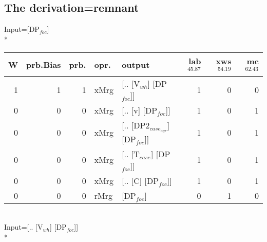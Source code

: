 \subsection{The derivation=remnant}
\begingroup\scriptsize Input=[DP$_{foc}$]\\*
\begin{tabularx}{\linewidth}{rrrlXrrr}
\hline
   W &   prb.Bias &   prb. & opr.   & output                       &   lab$^{45.87}$ &   xws$^{54.19}$ &   mc$^{62.43}$ \\
\hline
   1 &       1 &   1 & xMrg & [.. [V$_{wh}$] [DP$_{foc}$]]         &             1 &             0 &            0 \\
   0 &       0 &   0 & xMrg & [.. [v] [DP$_{foc}$]]            &             1 &             0 &            1 \\
   0 &       0 &   0 & xMrg & [.. [DP2$_{case_{agr}}$] [DP$_{foc}$]] &             1 &             0 &            1 \\
   0 &       0 &   0 & xMrg & [.. [T$_{case}$] [DP$_{foc}$]]       &             1 &             0 &            1 \\
   0 &       0 &   0 & xMrg & [.. [C] [DP$_{foc}$]]            &             1 &             0 &            1 \\
   0 &       0 &   0 & rMrg & [DP$_{foc}$]                     &             0 &             1 &            0 \\
\hline
\end{tabularx}\endgroup\\
\begingroup\scriptsize Input=[.. [V$_{wh}$] [DP$_{foc}$]]\\*

